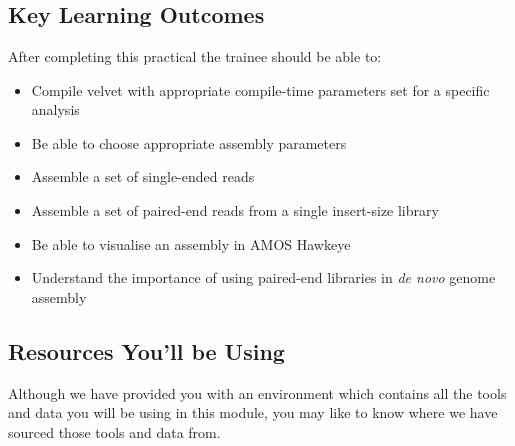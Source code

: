 \setModuleContributions{%
  
}

\chapter{\moduleTitle}
\newpage

\section{Key Learning Outcomes}

After completing this practical the trainee should be able to:
\begin{itemize}
  \item Compile velvet with appropriate compile-time parameters set for a specific analysis
  \item Be able to choose appropriate assembly parameters
  \item Assemble a set of single-ended reads
  \item Assemble a set of paired-end reads from a single insert-size library
  \item Be able to visualise an assembly in AMOS Hawkeye
  \item Understand the importance of using paired-end libraries in \textit{de
        novo} genome assembly
\end{itemize}

\section{Resources You'll be Using}
Although we have provided you with an environment which contains all the tools
and data you will be using in this module, you may like to know where we have
sourced those tools and data from.
 
